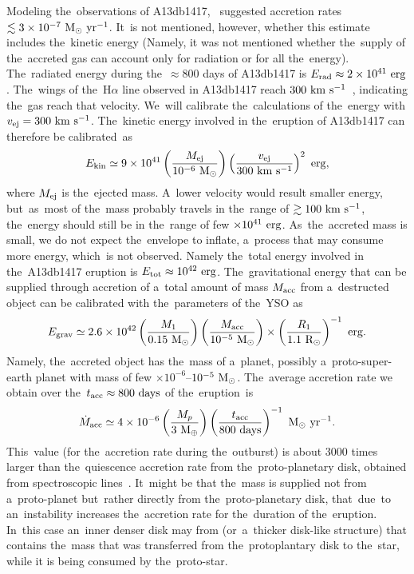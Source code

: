 \documentclass[galaxies,article,accept,moreauthors,pdftex]{mdpi}
\def \kms{~\rm{km~s^{-1}}}
\def \msyr{~\rm{M_{\odot}}~\rm{yr^{-1}}}
\def \erg{~\rm{erg}}
\def \days{~\rm{days}}
\def \sun{\odot}
\def \rmModot{~\rm{M_{\sun}}}
\def \rmRodot{~\rm{R_{\sun}}}
\def \rmME{~\rm{M_{\oplus}}}
\begin{document}
Modeling the~observations of A13db1417,~\cite{SiciliaAguilaretal2017} suggested accretion rates $\lesssim 3 \times 10^{-7} \msyr$. It~is not mentioned, however, whether this estimate includes the~kinetic energy (Namely, it was not mentioned whether the~supply of the~accreted gas can account only for radiation or for all the~energy). The~radiated energy during the~$\approx 800$ days of A13db1417 is $E_{\rm rad} \approx 2\times 10^{41} \erg$. The~wings of the~H$\alpha$ line observed in A13db1417 reach $300 \kms$~\cite{SiciliaAguilaretal2017}, indicating the~gas reach that velocity. We~will calibrate the~calculations of the~energy with $v_{\rm ej}=300 \kms$.
The~kinetic energy involved in the~eruption of A13db1417 can therefore be calibrated~as
\begin{equation}
E_{\rm kin} \simeq 9 \times 10^{41}
\left(\frac{M_{\rm ej}}{10^{-6}\rmModot}\right)
\left(\frac{v_{\rm ej}}{300 \kms}\right)^2 \erg, %
\label{eq:Ekin}
\end{equation}
where $M_{\rm ej}$ is the~ejected mass. A~lower velocity would result smaller energy, but~as~most of the~mass probably travels in the~range of $\gtrsim 100 \kms$, the~energy should still be in the~range of few $\times 10^{41} \erg$. As~the~accreted mass is small, we do not expect the~envelope to inflate, a~process that may consume more energy, which~is not observed. Namely the~total energy involved in the~A13db1417 eruption is $E_{\rm tot} \approx 10^{42} \erg$.
The~gravitational energy that can be supplied through accretion of a~total amount of mass $M_{\rm acc}$ from a~destructed object can be calibrated with the~parameters of the~YSO as
\begin{equation}
E_{\rm grav} \simeq 2.6 \times 10^{42}
\left(\frac{M_1}{0.15\rmModot}\right)
\left(\frac{M_{\rm acc}}{10^{-5}\rmModot}\right) 
\times \left(\frac{R_1}{1.1 \rmRodot}\right)^{-1} \erg. \\ %
\label{eq:Erad}
\end{equation}
Namely, the~accreted object has the~mass of a~planet, possibly a~proto-super-earth planet with mass of few $\times 10^{-6}$--$ 10^{-5}\rmModot$. The~average accretion rate we obtain over the~$t_{\rm acc} \approx 800 \days$ of the~eruption~is
\begin{equation}
\dot{M}_{\rm acc} \simeq 4 \times 10^{-6}
\left(\frac{M_p}{3 \rmME}\right) \left(\frac{t_{\rm acc}}{800 \days}\right)^{-1} \msyr. %
\label{eq:mdotacc}
\end{equation}
This~value (for the~accretion rate during the~outburst) is about 3000 times larger than the~quiescence accretion rate from the~proto-planetary disk, obtained from spectroscopic lines~\citep{SiciliaAguilaretal2017}. It~might be that the~mass is supplied not from a~proto-planet but~rather directly from the~proto-planetary disk, that~due~to an~instability increases the~accretion rate for the~duration of the~eruption. In~this case an~inner denser disk may from (or~a~thicker disk-like structure) that contains the~mass that was transferred from the~protoplantary disk to the~star, while it is being consumed by the~proto-star.
\end{document}
